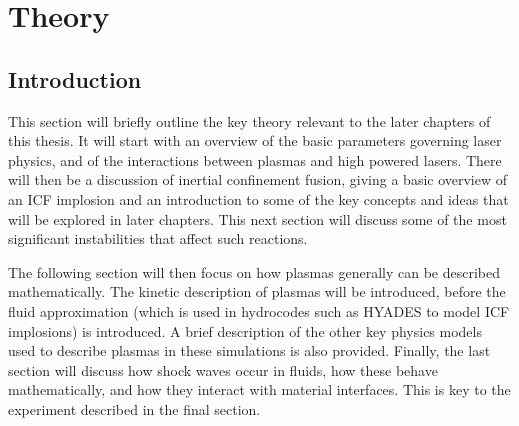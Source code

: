 

\chapter{\label{ch-theory}Theory}

\minitoc

\section{Introduction}
This section will briefly outline the key theory relevant to the later chapters of this thesis. It will start with an overview of the basic parameters governing laser physics, and of the interactions between plasmas and high powered lasers. There will then be a discussion of inertial confinement fusion, giving a basic overview of an ICF implosion and an introduction to some of the key concepts and ideas that will be explored in later chapters. This next section will discuss some of the most significant instabilities that affect such reactions.

The following section will then focus on how plasmas generally can be described mathematically. The kinetic description of plasmas will be introduced, before the fluid approximation (which is used in hydrocodes such as HYADES to model ICF implosions) is introduced. A brief description of the other key physics models used to describe plasmas in these simulations is also provided. Finally, the last section will discuss how shock waves occur in fluids, how these behave mathematically, and how they interact with material interfaces. This is key to the experiment described in the final section.


